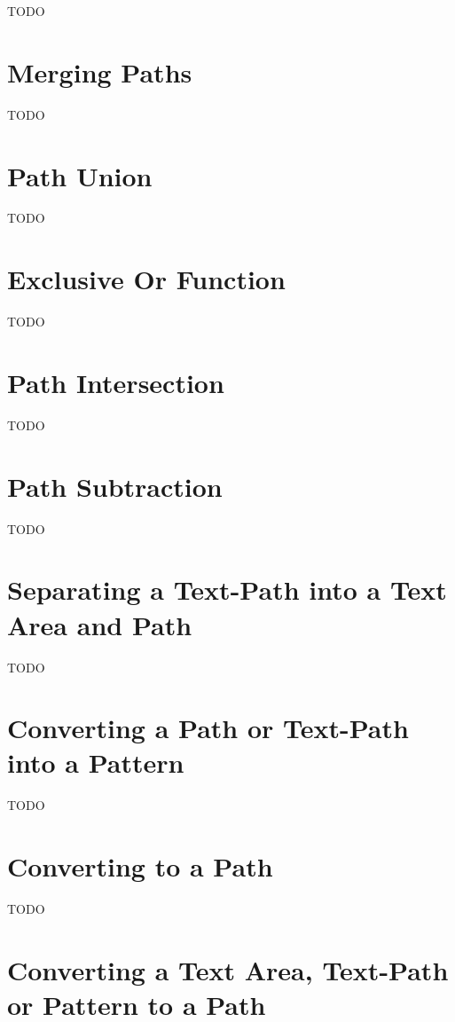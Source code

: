 TODO


\section{Merging Paths}\label{sec:mergepaths}

TODO


\section{Path Union}\label{sec:pathunion}

TODO


\section{Exclusive Or Function}\label{sec:xorpath}

TODO


\section{Path Intersection}\label{sec:pathintersect}

TODO


\section{Path Subtraction}\label{sec:pathsubtract}

TODO


\section{Separating a Text-Path into a Text Area and Path}\label{sec:separate}

TODO


\section{Converting a Path or Text-Path into a Pattern}\label{sec:patterns}

TODO


\section{Converting to a Path}\label{sec:converttopath}

TODO


\section{Converting a Text Area, Text-Path or Pattern to a Path}\label{sec:texttopath}


